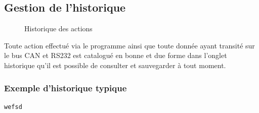 \documentclass[10pt,a4paper,final]{article}
\begin{document}
\begin{spacing}{1.5}
\subsection{Gestion de l'historique}
\begin{figure}[hbtp]
\caption{Historique des actions}
\centering
{}
\end{figure}
Toute action effectué via le programme ainsi que toute donnée ayant transité sur le bus CAN et RS232 est catalogué en bonne et due forme dans l'onglet historique qu'il est possible de consulter et sauvegarder à tout moment.

\subsubsection{Exemple d'historique typique}
\end{spacing}
\begin{verbatim}
wefsd
\end{verbatim}
\end{document}
